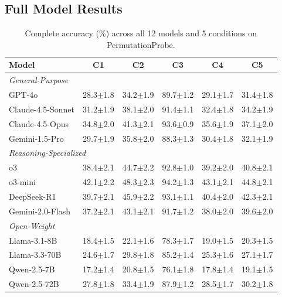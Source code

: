 \documentclass{article}
\theoremstyle{plain}
\theoremstyle{definition}
\theoremstyle{remark}
\begin{document}
\subsection{Full Model Results}

\begin{table}[h]
\centering
\caption{Complete accuracy (\%) across all 12 models and 5 conditions on PermutationProbe.}
\label{tab:full_results}
\small
\begin{tabular}{@{}lccccc@{}}
\toprule
\textbf{Model} & \textbf{C1} & \textbf{C2} & \textbf{C3} & \textbf{C4} & \textbf{C5} \\
\midrule
\multicolumn{6}{l}{\textit{General-Purpose}} \\
GPT-4o & 28.3$\pm$1.8 & 34.2$\pm$1.9 & 89.7$\pm$1.2 & 29.1$\pm$1.7 & 31.4$\pm$1.8 \\
Claude-4.5-Sonnet & 31.2$\pm$1.9 & 38.1$\pm$2.0 & 91.4$\pm$1.1 & 32.4$\pm$1.8 & 34.2$\pm$1.9 \\
Claude-4.5-Opus & 34.8$\pm$2.0 & 41.3$\pm$2.1 & 93.6$\pm$0.9 & 35.6$\pm$1.9 & 37.1$\pm$2.0 \\
Gemini-1.5-Pro & 29.7$\pm$1.9 & 35.8$\pm$2.0 & 88.3$\pm$1.3 & 30.4$\pm$1.8 & 32.1$\pm$1.9 \\
\midrule
\multicolumn{6}{l}{\textit{Reasoning-Specialized}} \\
o3 & 38.4$\pm$2.1 & 44.7$\pm$2.2 & 92.8$\pm$1.0 & 39.2$\pm$2.0 & 40.8$\pm$2.1 \\
o3-mini & 42.1$\pm$2.2 & 48.3$\pm$2.3 & 94.2$\pm$1.3 & 43.1$\pm$2.1 & 44.8$\pm$2.1 \\
DeepSeek-R1 & 39.7$\pm$2.1 & 45.9$\pm$2.2 & 93.1$\pm$1.1 & 40.4$\pm$2.0 & 42.3$\pm$2.1 \\
Gemini-2.0-Flash & 37.2$\pm$2.1 & 43.1$\pm$2.1 & 91.7$\pm$1.2 & 38.0$\pm$2.0 & 39.6$\pm$2.0 \\
\midrule
\multicolumn{6}{l}{\textit{Open-Weight}} \\
Llama-3.1-8B & 18.4$\pm$1.5 & 22.1$\pm$1.6 & 78.3$\pm$1.7 & 19.0$\pm$1.5 & 20.3$\pm$1.5 \\
Llama-3.3-70B & 24.6$\pm$1.7 & 29.8$\pm$1.8 & 85.2$\pm$1.4 & 25.3$\pm$1.6 & 27.1$\pm$1.7 \\
Qwen-2.5-7B & 17.2$\pm$1.4 & 20.8$\pm$1.5 & 76.1$\pm$1.8 & 17.8$\pm$1.4 & 19.1$\pm$1.5 \\
Qwen-2.5-72B & 27.8$\pm$1.8 & 33.4$\pm$1.9 & 87.9$\pm$1.2 & 28.5$\pm$1.7 & 30.2$\pm$1.8 \\
\bottomrule
\end{tabular}
\end{table}
\end{document}
